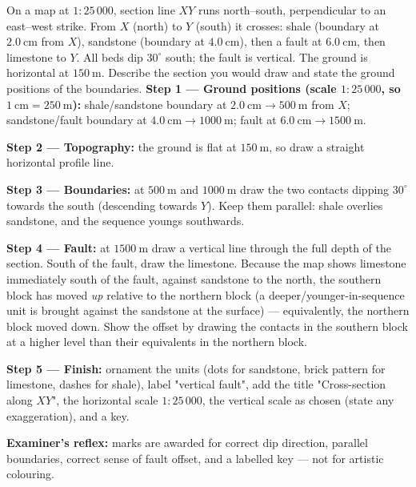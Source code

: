 \documentclass[11pt]{article}
\newcommand{\cle}[1]{{\popxbold\color{popdark}#1}}
\begin{document}
\begin{exoresolu}
On a map at $1:25\,000$, section line $XY$ runs north--south, perpendicular to an east--west strike. From $X$ (north) to $Y$ (south) it crosses: shale (boundary at $2.0\ \mathrm{cm}$ from $X$), sandstone (boundary at $4.0\ \mathrm{cm}$), then a fault at $6.0\ \mathrm{cm}$, then limestone to $Y$. All beds dip $30^{\circ}$ south; the fault is vertical. The ground is horizontal at $150\ \mathrm{m}$. Describe the section you would draw and state the ground positions of the boundaries.
\tcblower
\textbf{Step 1 — Ground positions (scale $1:25\,000$, so $1\ \mathrm{cm} = 250\ \mathrm{m}$):}
shale/sandstone boundary at $2.0\ \mathrm{cm} \rightarrow 500\ \mathrm{m}$ from $X$; sandstone/fault boundary at $4.0\ \mathrm{cm} \rightarrow 1000\ \mathrm{m}$; fault at $6.0\ \mathrm{cm} \rightarrow 1500\ \mathrm{m}$.

\textbf{Step 2 — Topography:} the ground is flat at $150\ \mathrm{m}$, so draw a straight horizontal profile line.

\textbf{Step 3 — Boundaries:} at $500\ \mathrm{m}$ and $1000\ \mathrm{m}$ draw the two contacts dipping $30^{\circ}$ towards the south (descending towards $Y$). Keep them parallel: shale overlies sandstone, and the sequence youngs southwards.

\textbf{Step 4 — Fault:} at $1500\ \mathrm{m}$ draw a \cle{vertical line} through the full depth of the section. South of the fault, draw the limestone. Because the map shows limestone immediately south of the fault, against sandstone to the north, the southern block has moved \emph{up} relative to the northern block (a deeper/younger-in-sequence unit is brought against the sandstone at the surface) — equivalently, the northern block moved down. Show the offset by drawing the contacts in the southern block at a higher level than their equivalents in the northern block.

\textbf{Step 5 — Finish:} ornament the units (dots for sandstone, brick pattern for limestone, dashes for shale), label "vertical fault", add the title "Cross-section along $XY$", the horizontal scale $1:25\,000$, the vertical scale as chosen (state any exaggeration), and a key.

\textbf{Examiner's reflex:} marks are awarded for correct dip direction, parallel boundaries, correct sense of fault offset, and a labelled key — not for artistic colouring.
\end{exoresolu}
\end{document}
